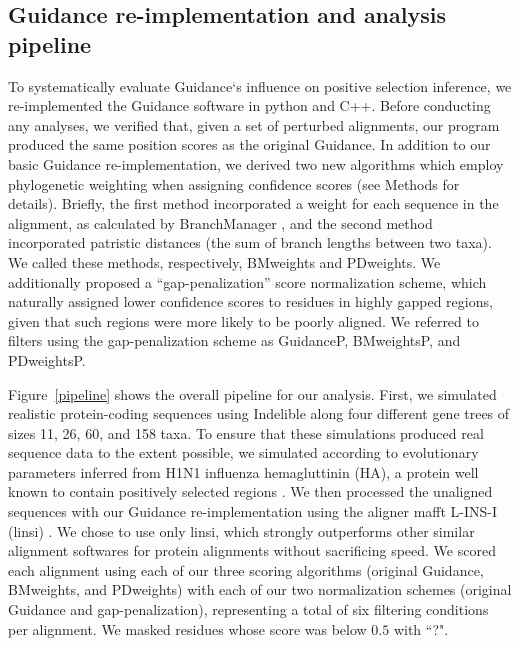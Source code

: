\documentclass[10pt]{article}
\begin{document}
\subsection*{Guidance re-implementation and analysis pipeline}
To systematically evaluate Guidance`s influence on positive selection inference, we re-implemented the Guidance software in python and C++. Before conducting any analyses, we verified that, given a set of perturbed alignments, our program produced the same position scores as the original Guidance. In addition to our basic Guidance re-implementation, we derived two new algorithms which employ phylogenetic weighting when assigning confidence scores (see Methods for details).  Briefly, the first method incorporated a weight for each sequence in the alignment, as calculated by BranchManager \citep{Stone2007}, and the second method incorporated patristic distances (the sum of branch lengths between two taxa). We called these methods, respectively, BMweights and PDweights.  We additionally proposed a ``gap-penalization” score normalization scheme, which naturally assigned lower confidence scores to residues in highly gapped regions, given that such regions were more likely to be poorly aligned. We referred to filters using the gap-penalization scheme as GuidanceP, BMweightsP, and PDweightsP.

Figure~\ref{pipeline} shows the overall pipeline for our analysis. First, we simulated realistic protein-coding sequences using Indelible \citep{Fletcher2009} along four different gene trees of sizes 11, 26, 60, and 158 taxa. To ensure that these simulations produced real sequence data to the extent possible, we simulated according to evolutionary parameters inferred from H1N1 influenza hemagluttinin (HA), a protein well known to contain positively selected regions \citep{Meyer2012}. We then processed the unaligned sequences with our Guidance re-implementation using the aligner mafft L-INS-I (linsi) \citep{Katoh2005}. We chose to use only linsi, which strongly outperforms other similar alignment softwares for protein alignments \citep{Thompson2011,Nuin2006}without sacrificing speed. We scored each alignment using each of our three scoring algorithms (original Guidance, BMweights, and PDweights) with each of our two normalization schemes (original Guidance and gap-penalization), representing a total of six filtering conditions per alignment. We masked residues whose score was below $0.5$ with ``?".  
\end{document}
